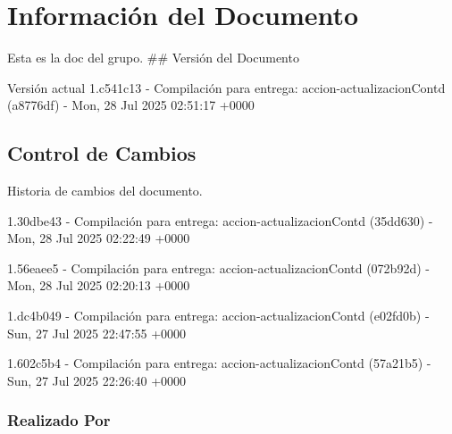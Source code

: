 \documentclass[
	a4paper, %
	12pt, %
]{include/CSSullivanBusinessReport}
\begin{document}
\newpage

\begin{twothirdswidth} %
	\tableofcontents %
\end{twothirdswidth}

\newpage


\newpage

\section{Información del
Documento}\label{sec:informaciuxf3n-del-documento}

Esta es la doc del grupo. \#\# Versión del Documento

\begin{quote}
\end{quote}

Versión actual 1.c541c13 - Compilación para entrega:
accion-actualizacionContd (a8776df) - Mon, 28 Jul 2025 02:51:17 +0000

\subsection{Control de Cambios}\label{sec:control-de-cambios}

Historia de cambios del documento.

1.30dbe43 - Compilación para entrega: accion-actualizacionContd
(35dd630) - Mon, 28 Jul 2025 02:22:49 +0000

1.56eaee5 - Compilación para entrega: accion-actualizacionContd
(072b92d) - Mon, 28 Jul 2025 02:20:13 +0000

1.dc4b049 - Compilación para entrega: accion-actualizacionContd
(e02fd0b) - Sun, 27 Jul 2025 22:47:55 +0000

1.602c5b4 - Compilación para entrega: accion-actualizacionContd
(57a21b5) - Sun, 27 Jul 2025 22:26:40 +0000

\subsubsection{Realizado Por}\label{sec:realizado-por}
\end{document}
